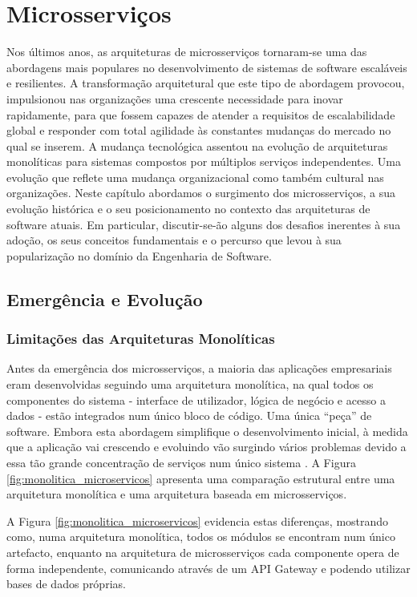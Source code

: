 \chapter{Microsserviços}

Nos últimos anos, as arquiteturas de microsserviços tornaram-se uma das abordagens mais populares no desenvolvimento de sistemas de software escaláveis e resilientes. A transformação arquitetural que este tipo de abordagem provocou, impulsionou nas organizações uma crescente necessidade para inovar rapidamente, para que fossem capazes de atender a requisitos de escalabilidade global e responder com total agilidade às constantes mudanças do mercado no qual se inserem. A mudança tecnológica assentou na evolução de arquiteturas monolíticas para sistemas compostos por múltiplos serviços independentes. Uma evolução que reflete uma mudança organizacional como também cultural nas organizações. Neste capítulo abordamos o surgimento dos microsserviços, a sua evolução histórica e o seu posicionamento no contexto das arquiteturas de software atuais. Em particular, discutir-se-ão alguns dos desafios inerentes à sua adoção, os seus conceitos fundamentais e o percurso que levou à sua popularização no domínio da Engenharia de Software.

\section{Emergência e Evolução}

\subsection{Limitações das Arquiteturas Monolíticas}

Antes da emergência dos microsserviços, a maioria das aplicações empresariais eram desenvolvidas seguindo uma arquitetura monolítica, na qual todos os componentes do sistema - interface de utilizador, lógica de negócio e acesso a dados - estão integrados num único bloco de código. Uma única “peça” de software. Embora esta abordagem simplifique o desenvolvimento inicial, à medida que a aplicação vai crescendo e evoluindo vão surgindo vários problemas devido a essa tão grande concentração de serviços num único sistema \cite{Villamizar2015}. A Figura \ref{fig:monolitica_microservicos} apresenta uma comparação estrutural entre uma arquitetura monolítica e uma arquitetura baseada em microsserviços.

\clearpage

A Figura \ref{fig:monolitica_microservicos} evidencia estas diferenças, mostrando como, numa arquitetura monolítica, todos os módulos se encontram num único artefacto, enquanto na arquitetura de microsserviços cada componente opera de forma independente, comunicando através de um API Gateway e podendo utilizar bases de dados próprias.


